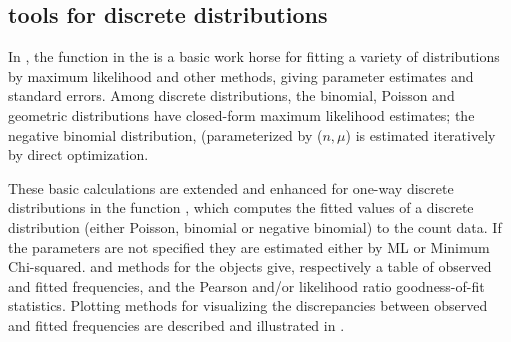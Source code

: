 \documentclass[11pt]{book}\usepackage[]{graphicx}\usepackage[]{color}
\begin{document}
\subsection[R tools for discrete distributions]{\R tools for discrete distributions}\label{sec:fitdistr}
In \R, the function  in the 
is a basic work horse for fitting a variety of distributions
by maximum likelihood and other methods, giving parameter estimates
and standard errors.
Among discrete distributions, the binomial,
Poisson and geometric distributions have closed-form 
maximum likelihood estimates; the negative binomial distribution,
(parameterized by ($n, \mu$) is estimated iteratively by direct
optimization.

These basic calculations are extended and enhanced for one-way
discrete distributions in the  function
, which 
computes the fitted values of a discrete distribution (either Poisson, binomial or negative binomial) to the count data. 
If the parameters are not specified they are estimated either by ML or Minimum Chi-squared.  and  methods for
the  objects give, respectively a table of
observed and fitted frequencies, and the Pearson and/or likelihood
ratio goodness-of-fit statistics. Plotting methods for visualizing
the discrepancies between observed and fitted frequencies are
described and illustrated in .
\end{document}
